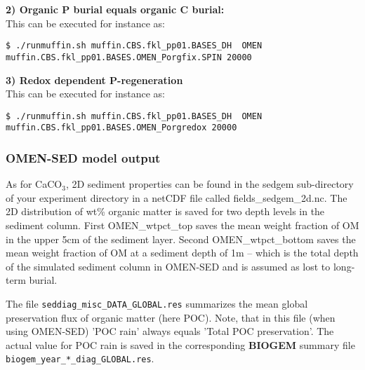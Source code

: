 \vspace{1mm}
\noindent
\textbf{2) Organic P burial equals organic C burial:}\\
This can be executed for instance as:
\vspace{-1mm}
\begin{verbatim}
$ ./runmuffin.sh muffin.CBS.fkl_pp01.BASES_DH  OMEN
muffin.CBS.fkl_pp01.BASES.OMEN_Porgfix.SPIN 20000
\end{verbatim}
\vspace{-1mm}

\vspace{1mm}
\noindent
\textbf{3) Redox dependent P-regeneration}\\
This can be executed for instance as:
\vspace{-1mm}
\begin{verbatim}
$ ./runmuffin.sh muffin.CBS.fkl_pp01.BASES_DH  OMEN
muffin.CBS.fkl_pp01.BASES.OMEN_Porgredox 20000
\end{verbatim}
\vspace{-1mm}

%
\subsubsection*{OMEN-SED model output}
As for CaCO$_3$, 2D sediment properties can be found in  the \textsf{\footnotesize sedgem } sub-directory of your experiment directory  in a netCDF file called \textsf{\footnotesize fields\_sedgem\_2d.nc}.
The 2D distribution of wt\% organic matter is saved for two depth levels in the sediment column. First \textsf{\footnotesize OMEN\_wtpct\_top} saves the mean weight fraction of OM in the upper 5cm of the sediment layer.
Second \textsf{\footnotesize OMEN\_wtpct\_bottom} saves the mean weight fraction of OM at a sediment depth of 1m -- which is the total depth of the simulated sediment column in OMEN-SED and is assumed as lost to long-term burial.

The file \texttt{seddiag\_misc\_DATA\_GLOBAL.res} summarizes the mean global preservation flux of organic matter (here POC). Note, that in this file (when using OMEN-SED) 'POC rain' always equals 'Total POC preservation'. The actual value for
POC rain is saved in the corresponding \textbf{BIOGEM} summary file \texttt{biogem\_year\_*\_diag\_GLOBAL.res}.


\newpage


